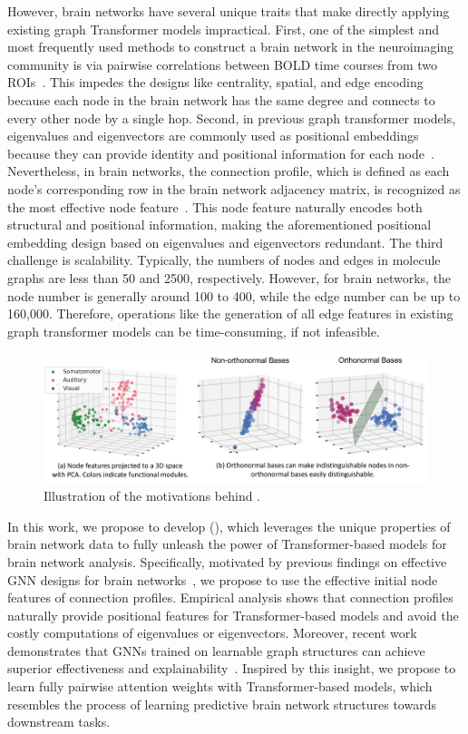 However, brain networks have several unique traits that make directly applying existing graph Transformer models impractical. First, one of the simplest and most frequently used methods to construct a brain network in the neuroimaging community is via pairwise correlations between BOLD time courses from two ROIs~\citep{li2020braingnn, kan2022fbnetgen, braingb, yang2022data, zhu2022joint}. This impedes the designs like centrality, spatial, and edge encoding because each node in the brain network has the same degree and connects to every other node by a single hop. 
Second, in previous graph transformer models, eigenvalues and eigenvectors are commonly used as positional embeddings because they can provide identity and positional information for each node~\cite{cui2021positional,9361263}. Nevertheless, in brain networks, the connection profile, which is defined as each node's corresponding row in the brain network adjacency matrix, is recognized as the most effective node feature~\cite{braingb}. This node feature naturally encodes both structural and positional information, making the aforementioned positional embedding design based on eigenvalues and eigenvectors redundant. The third challenge is scalability. Typically, the numbers of nodes and edges in molecule graphs are less than 50 and 2500, respectively. However, for brain networks, the node number is generally around 100 to 400, while the edge number can be up to 160,000. Therefore, operations like the generation of all edge features in existing graph transformer models can be time-consuming, if not infeasible.

\begin{figure}[h]
    \centering
    \includegraphics[width=0.8\linewidth]{figures/figure1.pdf}
    \caption{Illustration of the motivations behind \pooling.}
    \label{fig:motivation}
\end{figure}

In this work, we propose to develop \methodfull (\methodtable), which leverages the unique properties of brain network data to fully unleash the power of Transformer-based models for brain network analysis. Specifically, motivated by previous findings on effective GNN designs for brain networks~\citep{braingb}, we propose to use the effective initial node features of connection profiles. Empirical analysis shows that connection profiles naturally provide positional features for Transformer-based models and avoid the costly computations of eigenvalues or eigenvectors. Moreover, recent work demonstrates that GNNs trained on learnable graph structures can achieve superior effectiveness and explainability~\citep{kan2022fbnetgen}. Inspired by this insight, we propose to learn fully pairwise attention weights with Transformer-based models, which resembles the process of learning predictive brain network structures towards downstream tasks.
 
